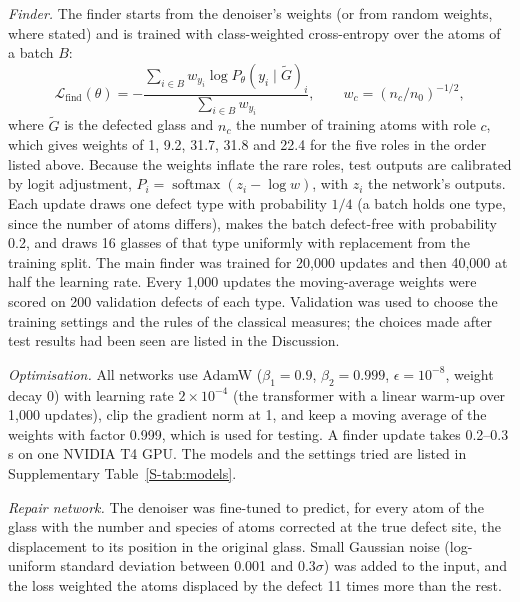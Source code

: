 \documentclass[11pt]{article}
\begin{document}
\emph{Finder.} The finder starts from the denoiser's weights (or from random weights, where stated) and is trained with class-weighted cross-entropy over the atoms of a batch $B$:
\begin{equation}
\mathcal L_{\text{find}}(\theta)=-\frac{\sum_{i\in B} w_{y_i}\log P_\theta(y_i\mid\tilde G)_i}{\sum_{i\in B} w_{y_i}},\qquad w_c=(n_c/n_0)^{-1/2},
\label{eq:find}
\end{equation}
where $\tilde G$ is the defected glass and $n_c$ the number of training atoms with role $c$, which gives weights of 1, 9.2, 31.7, 31.8 and 22.4 for the five roles in the order listed above. Because the weights inflate the rare roles, test outputs are calibrated by logit adjustment\citep{menon2021}, $P_i=\operatorname{softmax}(z_i-\log w)$, with $z_i$ the network's outputs. Each update draws one defect type with probability $1/4$ (a batch holds one type, since the number of atoms differs), makes the batch defect-free with probability 0.2, and draws 16 glasses of that type uniformly with replacement from the training split. The main finder was trained for 20,000 updates and then 40,000 at half the learning rate. Every 1,000 updates the moving-average weights were scored on 200 validation defects of each type. Validation was used to choose the training settings and the rules of the classical measures; the choices made after test results had been seen are listed in the Discussion.

\emph{Optimisation.} All networks use AdamW\citep{loshchilov2019adamw} ($\beta_1=0.9$, $\beta_2=0.999$, $\epsilon=10^{-8}$, weight decay 0) with learning rate $2\times10^{-4}$ (the transformer with a linear warm-up over 1,000 updates), clip the gradient norm at 1, and keep a moving average of the weights with factor 0.999, which is used for testing. A finder update takes 0.2--0.3\,s on one NVIDIA T4 GPU. The models and the settings tried are listed in Supplementary Table~\ref{S-tab:models}.

\emph{Repair network.} The denoiser was fine-tuned to predict, for every atom of the glass with the number and species of atoms corrected at the true defect site, the displacement to its position in the original glass. Small Gaussian noise (log-uniform standard deviation between 0.001 and $0.3\sigma$) was added to the input, and the loss weighted the atoms displaced by the defect 11 times more than the rest.
\end{document}
